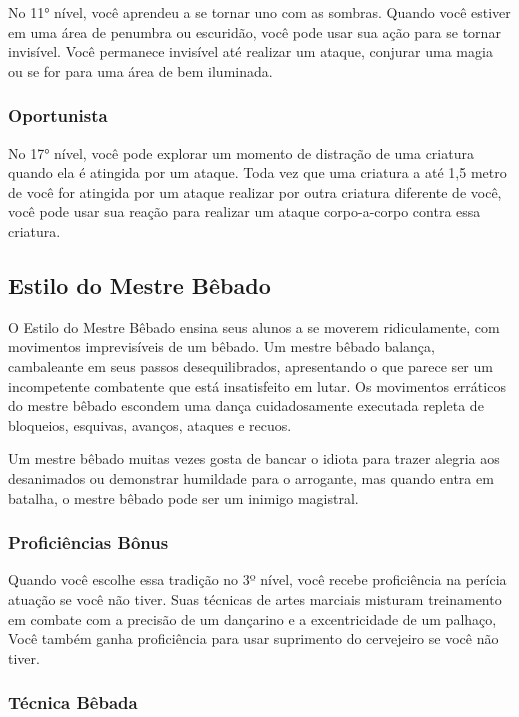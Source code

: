 \begin{multicols}{2}
No 11° nível, você aprendeu a se tornar uno com as sombras. Quando você estiver
em uma área de penumbra ou escuridão, você pode usar sua ação para se tornar
invisível. Você permanece invisível até realizar um ataque, conjurar uma magia
ou se for para uma área de bem iluminada.

\subsubsection*{Oportunista}%
\label{ssub:oportunista}

No 17° nível, você pode explorar um momento de distração de uma criatura quando
ela é atingida por um ataque. Toda vez que uma criatura a até 1,5 metro de você
for atingida por um ataque realizar por outra criatura diferente de você, você
pode usar sua reação para realizar um ataque corpo-a-corpo contra essa
criatura.

\subsection*{Estilo do Mestre Bêbado}%
\label{sub:estilo_do_mestre_bebado}

O Estilo do Mestre Bêbado ensina seus alunos a se moverem ridiculamente, com
movimentos imprevisíveis de um bêbado. Um mestre bêbado balança, cambaleante em
seus passos desequilibrados, apresentando o que parece ser um incompetente
combatente que está insatisfeito em lutar. Os movimentos erráticos do mestre
bêbado escondem uma dança cuidadosamente executada repleta de bloqueios,
esquivas, avanços, ataques e recuos.

Um mestre bêbado muitas vezes gosta de bancar o idiota para trazer alegria aos
desanimados ou demonstrar humildade para o arrogante, mas quando entra em
batalha, o mestre bêbado pode ser um inimigo magistral.

\subsubsection*{Proficiências Bônus}%
\label{ssub:proficiencias_bonus}

Quando você escolhe essa tradição no 3º nível, você recebe proficiência na
perícia atuação se você não tiver. Suas técnicas de artes marciais misturam
treinamento em combate com a precisão de um dançarino e a excentricidade de um
palhaço, Você também ganha proficiência para usar suprimento do cervejeiro se
você não tiver.

\subsubsection*{Técnica Bêbada}%
\label{ssub:tecnica_bebada}


\end{multicols}
